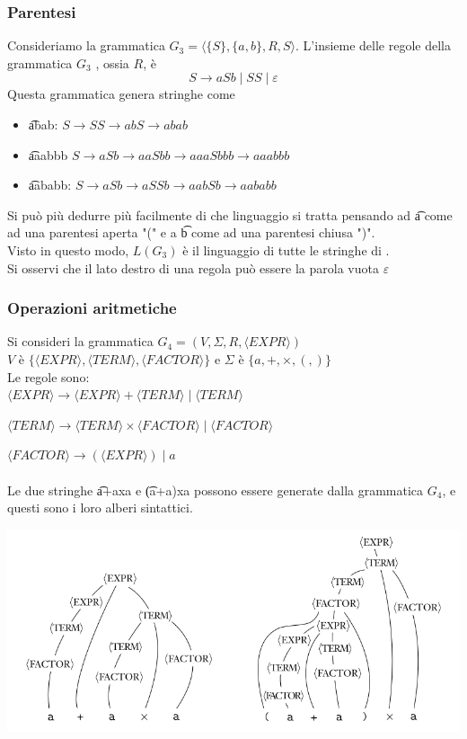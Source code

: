 \subsubsection{Parentesi}
Consideriamo la grammatica $G_3 = \langle \{S\}, \{a,b\}, R, S\rangle$.  L'insieme delle regole della grammatica $G_3$ , ossia $R$, è
$$S\rightarrow aSb \mid SS \mid \varepsilon$$
Questa grammatica genera stringhe come 
\begin{itemize}
	\item \t{abab}: $S\rightarrow SS\rightarrow abS \rightarrow abab$ 
	\item \t{aaabbb} $S\rightarrow aSb\rightarrow aaSbb \rightarrow aaaSbbb\rightarrow aaabbb$ 
	\item \t{aababb}: $S\rightarrow aSb\rightarrow aSSb\rightarrow aabSb\rightarrow aababb$ \\
\end{itemize}
Si può più dedurre più facilmente di che linguaggio si tratta pensando ad \t{a} come ad una parentesi aperta "(" e a \t{b}
come ad una parentesi chiusa ")". \\
Visto in questo modo, $L(G_3)$ è il linguaggio di tutte le stringhe di .\\
Si osservi che il lato destro di una regola può essere la parola vuota $\varepsilon$ 

\subsubsection{Operazioni aritmetiche}
Si consideri la grammatica $G_4 = (V,\Sigma, R, \langle EXPR \rangle)$\\
$V$ è $\{\langle EXPR \rangle, \langle TERM \rangle, \langle FACTOR \rangle\}$ e $\Sigma$ è $\{a, +, \times, (,)\}$ \\
Le regole sono: \\
	
	$\langle EXPR \rangle \rightarrow \langle EXPR \rangle + \langle  TERM\rangle \mid \langle  TERM\rangle$
	
	$\langle TERM \rangle \rightarrow \langle TERM\rangle \times \langle FACTOR\rangle \mid \langle FACTOR \rangle$ 
	
	$\langle FACTOR\rangle \rightarrow (\langle EXPR\rangle) \mid a$\\
\\
Le due stringhe \t{a+axa} e \t{(a+a)xa} possono essere generate dalla grammatica $G_4$, e questi sono i loro alberi sintattici. \\
\begin{center}
	\includegraphics[scale=0.5]{img/alberi_g_4.png}
\end{center}
